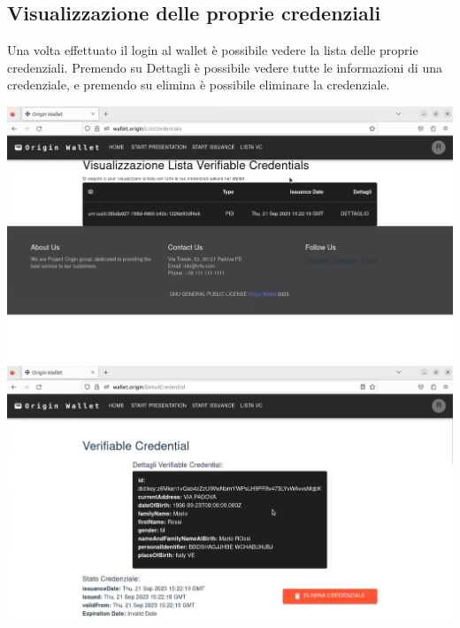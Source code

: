 \subsection{Visualizzazione delle proprie credenziali}
Una volta effettuato il login al wallet è possibile vedere la lista delle proprie credenziali. Premendo su Dettagli è possibile vedere tutte le informazioni di una credenziale, e premendo su elimina è possibile eliminare la credenziale.
\begin{center}
    \includegraphics[scale = 0.2]{./res/img/wallet/new/wallet_credential_list.png}
    \includegraphics[scale = 0.2]{./res/img/wallet/new/wallet_credential_detail.png}
\end{center}

